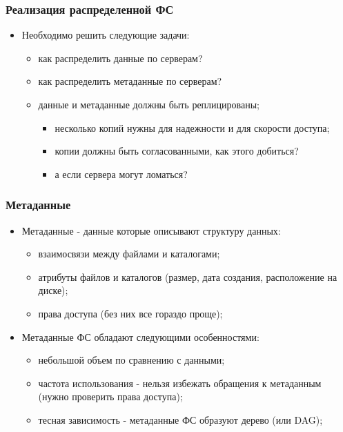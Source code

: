 \begin{frame}
\frametitle{Реализация распределенной ФС}
\begin{itemize}
  \item<1-> Необходимо решить следующие задачи:
    \begin{itemize}
      \item как распределить данные по серверам?
      \item как распределить метаданные по серверам?
      \item данные и метаданные должны быть реплицированы;
        \begin{itemize}
          \item несколько копий нужны для надежности и для скорости доступа;
          \item копии должны быть согласованными, как этого добиться?
          \item<2-> а если сервера могут ломаться?
        \end{itemize}
    \end{itemize}
\end{itemize}
\end{frame}

\begin{frame}
\frametitle{Метаданные}
\begin{itemize}
  \item<1-> Метаданные - данные которые описывают структуру данных:
    \begin{itemize}
      \item взаимосвязи между файлами и каталогами;
      \item атрибуты файлов и каталогов (размер, дата создания, расположение на диске);
      \item права доступа (без них все гораздо проще);
    \end{itemize}
  \item<2-> Метаданные ФС обладают следующими особенностями:
    \begin{itemize}
      \item небольшой объем по сравнению с данными;
      \item частота использования - нельзя избежать обращения к метаданным (нужно проверить права доступа);
      \item тесная зависимость - метаданные ФС образуют дерево (или DAG);
    \end{itemize}
\end{itemize}
\end{frame}

